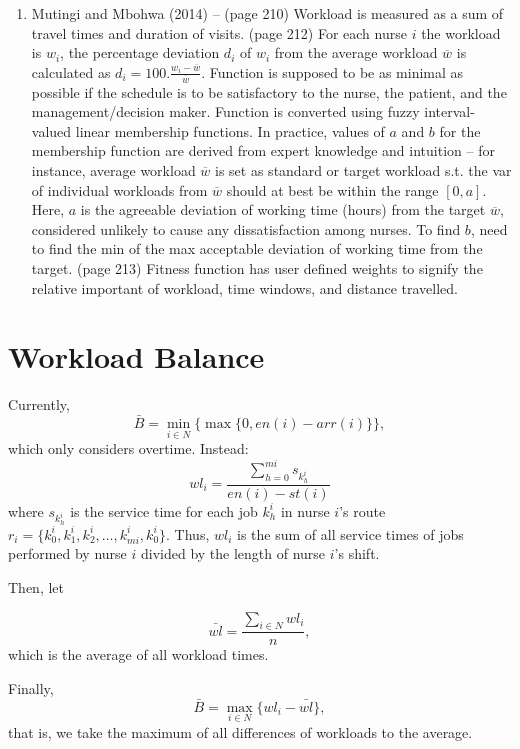 \documentclass[a4paper]{article}
\begin{document}
\begin{enumerate}[leftmargin=*]
	\item Mutingi and Mbohwa (2014) -- (page 210) Workload is measured as a sum of travel times and duration of visits. (page 212) For each nurse $i$ the workload is $w_i$, the percentage deviation $d_i$ of $w_i$ from the average workload $\overline{w}$ is calculated as $d_i =100.\frac{w_i - \overline{w}}{\overline{w}}$. Function is supposed to be as minimal as possible if the schedule is to be satisfactory to the nurse, the patient, and the management/decision maker. Function is converted using fuzzy interval-valued linear membership functions. In practice, values of $a$ and $b$ for the membership function are derived from expert knowledge and intuition -- for instance, average workload $\overline{w}$ is set as standard or target workload s.t. the var of individual workloads from $\overline{w}$ should at best be within the range $[0,a]$. Here, $a$ is the agreeable deviation of working time (hours) from the target $\overline{w}$, considered unlikely to cause any dissatisfaction among nurses. To find $b$, need to find the min of the max acceptable deviation of working time from the target. (page 213) Fitness function has user defined weights to signify the relative important of workload, time windows, and distance travelled.
\end{enumerate}

\section{Workload Balance}

Currently, 
\begin{equation}
	\bar{B} = \min_{i \in N} \{\max\{0, en(i) - arr(i)\}\},
\end{equation}
which only considers overtime.
Instead:
\begin{equation}
	wl_i = \frac{\displaystyle\sum_{h=0}^{mi} s_{k_{h}^{i}}}{en(i) - st(i)}
\end{equation}
where $s_{k_{h}^{i}}$ is the service time for each job $k_{h}^{i}$ in nurse $i$'s route $r_i = \{k_{0}^{i}, k_{1}^{i}, k_{2}^{i}, \dotsc, k_{mi}^{i}, k_{0}^{i}\}$. Thus, $wl_i$ is the sum of all service times of jobs performed by nurse $i$ divided by the length of nurse $i$'s shift.

Then, let

\begin{equation}
	\bar{wl} = \frac{\displaystyle\sum_{i \in N} wl_i}{n},
\end{equation}
which is the average of all workload times.

Finally,
\begin{equation}
	\bar{B} = \max_{i \in N}\{wl_i - \bar{wl}\},
\end{equation}	
that is, we take the maximum of all differences of workloads to the average.

	
	
	
\end{document}
